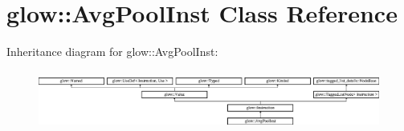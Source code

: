 \hypertarget{classglow_1_1_avg_pool_inst}{}\section{glow\+:\+:Avg\+Pool\+Inst Class Reference}
\label{classglow_1_1_avg_pool_inst}
Inheritance diagram for glow\+:\+:Avg\+Pool\+Inst\+:\begin{figure}[H]
\begin{center}
\leavevmode
\includegraphics[height=1.991111cm]{classglow_1_1_avg_pool_inst}
\end{center}
\end{figure}
